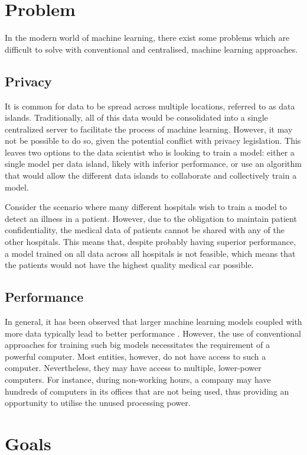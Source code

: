 \section{Problem}
In the modern world of machine learning, there exist some problems which are difficult to solve with conventional and centralised, machine learning approaches.

\subsection{Privacy}
It is common for data to be spread across multiple locations, referred to as data islands. Traditionally, all of this data would be consolidated into a single centralized server to facilitate the process of machine learning. However, it may not be possible to do so, given the potential conflict with privacy legislation. This leaves two options to the data scientist who is looking to train a model: either a single model per data island, likely with inferior performance, or use an algorithm that would allow the different data islands to collaborate and collectively train a model.

Consider the scenario where many different hospitals wish to train a model to detect an illness in a patient. However, due to the obligation to maintain patient confidentiality, the medical data of patients cannot be shared with any of the other hospitals. This means that, despite probably having superior performance, a model trained on all data across all hospitals is not feasible, which means that the patients would not have the highest quality medical car possible.

\subsection{Performance}
In general, it has been observed that larger machine learning models coupled with more data typically lead to better performance \citeme. However, the use of conventional approaches for training such big models necessitates the requirement of a powerful computer. Most entities, however, do not have access to such a computer. Nevertheless, they may have access to multiple, lower-power computers. For instance, during non-working hours, a company may have hundreds of computers in its offices that are not being used, thus providing an opportunity to utilise the unused processing power.

\section{Goals}

